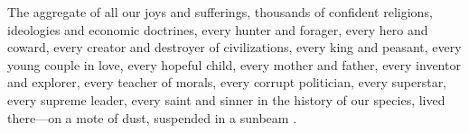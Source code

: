 \begin{displayquote}
The aggregate of all our joys and sufferings, thousands of confident religions, ideologies and economic doctrines, every hunter and forager, every hero and coward, every creator and destroyer of civilizations, every king and peasant, every young couple in love, every hopeful child, every mother and father, every inventor and explorer, every teacher of morals, every corrupt politician, every superstar, every supreme leader, every saint and sinner in the history of our species, lived there---on a mote of dust, suspended in a sunbeam \citep[][S. 6--7; see Figure \ref{samplefig}]{Sagan1994}.
\end{displayquote}






